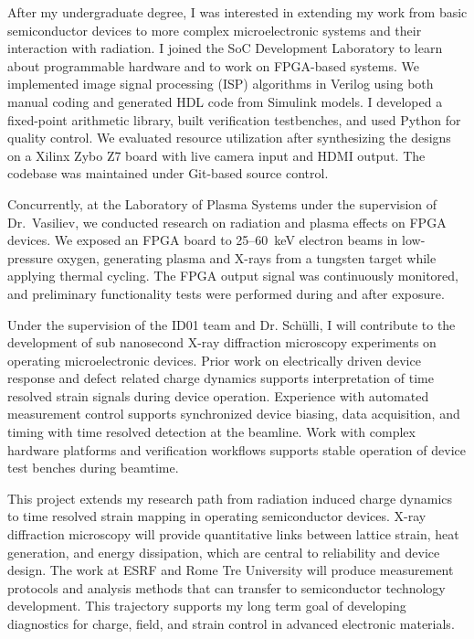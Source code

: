\documentclass[a4paper,12pt]{article}
\begin{document}
After my undergraduate degree, I was interested in extending my work from basic semiconductor devices to more complex microelectronic systems and their interaction with radiation. I joined the SoC Development Laboratory to learn about programmable hardware and to work on FPGA-based systems. We implemented image signal processing (ISP) algorithms in Verilog using both manual coding and generated HDL code from Simulink models. I developed a fixed-point arithmetic library, built verification testbenches, and used Python for quality control. We evaluated resource utilization after synthesizing the designs on a Xilinx Zybo Z7 board with live camera input and HDMI output. The codebase was maintained under Git-based source control. 

Concurrently, at the Laboratory of Plasma Systems under the supervision of Dr.\ Vasiliev, we conducted research on radiation and plasma effects on FPGA devices. We exposed an FPGA board to 25--60~keV electron beams in low-pressure oxygen, generating plasma and X-rays from a tungsten target while applying thermal cycling. The FPGA output signal was continuously monitored, and preliminary functionality tests were performed during and after exposure.

Under the supervision of the ID01 team and Dr. Schülli, I will contribute to the development of sub nanosecond X-ray diffraction microscopy experiments on operating microelectronic devices. Prior work on electrically driven device response and defect related charge dynamics supports interpretation of time resolved strain signals during device operation. Experience with automated measurement control supports synchronized device biasing, data acquisition, and timing with time resolved detection at the beamline. Work with complex hardware platforms and verification workflows supports stable operation of device test benches during beamtime.

This project extends my research path from radiation induced charge dynamics to time resolved strain mapping in operating semiconductor devices. X-ray diffraction microscopy will provide quantitative links between lattice strain, heat generation, and energy dissipation, which are central to reliability and device design. The work at ESRF and Rome Tre University will produce measurement protocols and analysis methods that can transfer to semiconductor technology development. This trajectory supports my long term goal of developing diagnostics for charge, field, and strain control in advanced electronic materials.
\end{document}
